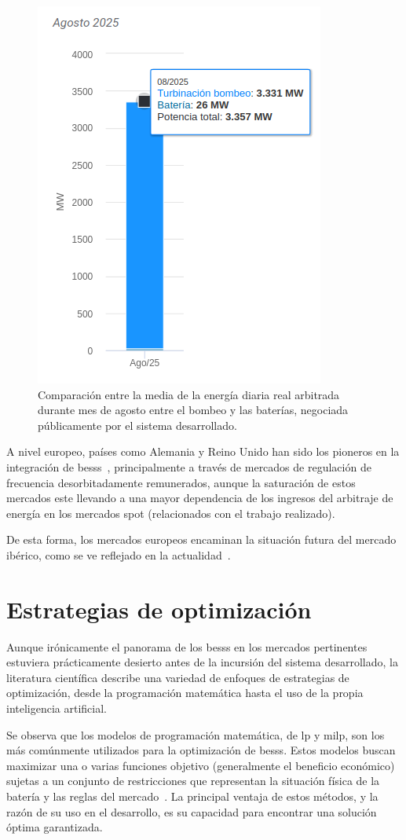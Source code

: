 \begin{figure}
  \centering
  \includegraphics[width=0.4\linewidth]{figures/comparacion-energia-ciclada.png}
  \caption[Comparación de la energía diaria arbitrada.]{Comparación entre la media de la energía diaria real arbitrada durante mes de agosto entre el bombeo y las baterías, negociada públicamente por el sistema desarrollado.}
  \label{fig:comparacion-energia-ciclada}
\end{figure}

A nivel europeo, países como Alemania y Reino Unido han sido los pioneros en la integración de \glspl{bess}~\cite{kivipelto2017grid, tejada2019review}, principalmente a través de mercados de regulación de frecuencia desorbitadamente remunerados, aunque la saturación de estos mercados este llevando a una mayor dependencia de los ingresos del arbitraje de energía en los mercados spot (relacionados con el trabajo realizado).

De esta forma, los mercados europeos encaminan la situación futura del mercado ibérico, como se ve reflejado en la actualidad~\cite{kumar2019strategic}.

\section{Estrategias de optimización}
\label{makereference2.2}

Aunque irónicamente el panorama de los \glspl{bess} en los mercados pertinentes estuviera prácticamente desierto antes de la incursión del sistema desarrollado, la literatura científica describe una variedad de enfoques de estrategias de optimización, desde la programación matemática hasta el uso de la propia inteligencia artificial.

Se observa que los modelos de programación matemática, de \gls{lp} y \gls{milp}, son los más comúnmente utilizados para la optimización de \glspl{bess}. Estos modelos buscan maximizar una o varias funciones objetivo (generalmente el beneficio económico) sujetas a un conjunto de restricciones que representan la situación física de la batería y las reglas del mercado~\cite{mendoza2023review}. La principal ventaja de estos métodos, y la razón de su uso en el desarrollo, es su capacidad para encontrar una solución óptima garantizada.

